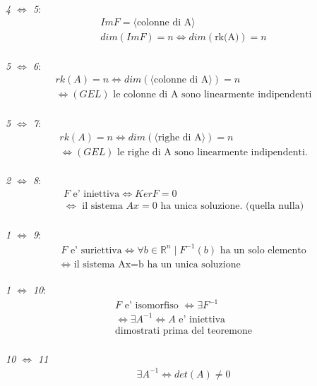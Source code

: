 \documentclass{article}
\begin{document}
\\ \textit{4 $\iff$ 5}:
\begin{align*}
    Im F = \langle \text{colonne di A}\rangle \\
    dim(Im F)=n \iff dim(\text{rk(A)})=n
\end{align*}
\\ \textit{5 $\iff$ 6}:
\begin{align*}
    rk(A)=n \iff dim(\langle \text{colonne di A}\rangle)=n
    \\ \iff (GEL) \text{  le colonne di A sono linearmente indipendenti}
\end{align*}
\\ \textit{5 $\iff$ 7}:
\begin{align*}
    rk(A)=n \iff dim(\langle \text{righe di A}\rangle) =n
    \\ \iff(GEL) \text{  le righe di A sono linearmente indipendenti}.
\end{align*}
\\ \textit{2 $\iff$ 8}:
\begin{align*}
    F \text{ e' iniettiva} \iff Ker F={0}
    \\ \iff \text{ il sistema }Ax=0 \text{ ha unica soluzione. (quella nulla)}
\end{align*}
\\ \textit{1 $\iff$ 9}:
\begin{align*}
    F \text{ e' suriettiva} \iff \forall b \in \mathbb{R}^n \mid F^{-1}(b) \text{ ha un solo elemento}
    \\ \iff \text{ il sistema Ax=b ha un unica soluzione}
\end{align*}
\\ \textit{1 $\iff$ 10}:
\begin{align*}
    F \text{ e' isomorfiso } \iff \exists F^{-1} \\
    \iff \exists A^{-1} \iff A \text{ e' iniettiva}
    \\ \text{dimostrati prima del teoremone}
\end{align*}
\\\textit{10 $\iff$ 11}
\begin{align*}
  \exists A^{-1} \iff det(A)\neq 0
\end{align*}
\end{document}
